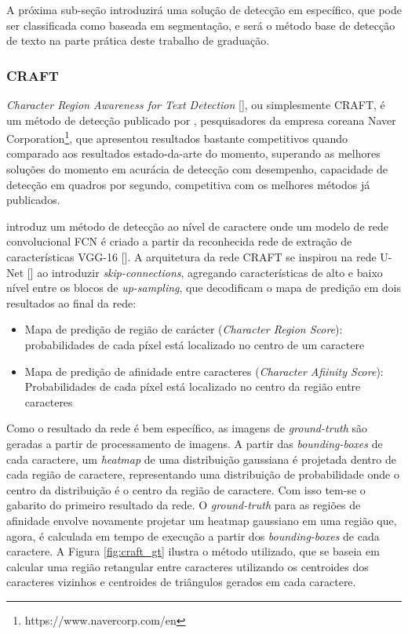 A próxima sub-seção introduzirá uma solução de detecção em específico, que pode ser classificada como baseada em segmentação, e será o método base de detecção 
de texto na parte prática deste trabalho de graduação.


\subsubsection{CRAFT}\label{craft}
\textit{Character Region Awareness for Text Detection} [], ou simplesmente CRAFT, é um método de detecção publicado por \citeauthor{CRAFT}, 
pesquisadores da empresa coreana Naver Corporation\footnote{https://www.navercorp.com/en}, que apresentou resultados bastante competitivos quando comparado 
aos resultados estado-da-arte do momento, superando as melhores soluções do momento em acurácia de detecção com desempenho, capacidade de detecção em quadros 
por segundo, competitiva com os melhores métodos já publicados.
	
\citeauthor{CRAFT} introduz um método de detecção ao nível de caractere onde um modelo de rede convolucional FCN é criado a partir da reconhecida rede de 
extração de características VGG-16 []. A arquitetura da rede CRAFT se inspirou na rede U-Net [] ao introduzir 
\textit{skip-connections}, agregando características de alto e baixo nível entre os blocos de \textit{up-sampling}, que decodificam o mapa de predição em 
dois resultados ao final da rede:

\begin{itemize}
    \item {Mapa de predição de região de carácter (\textit{Character Region Score}): probabilidades de cada píxel está localizado no centro de um caractere}

    \item {Mapa de predição de afinidade entre caracteres (\textit{Character Afiinity Score}): Probabilidades de cada píxel está localizado no centro da região entre caracteres}
\end{itemize}

Como o resultado da rede é bem específico, as imagens de \textit{ground-truth} são geradas a partir de processamento de imagens. A partir das 
\textit{bounding-boxes} de cada caractere, um \textit{heatmap} de uma distribuição gaussiana é projetada dentro de cada região de caractere, representando 
uma distribuição de probabilidade onde o centro da distribuição é o centro da região de caractere. Com isso tem-se o gabarito do primeiro resultado da rede. 
O \textit{ground-truth} para as regiões de afinidade envolve novamente projetar um heatmap gaussiano em uma região que, agora, é calculada em tempo de 
execução a partir dos \textit{bounding-boxes} de cada caractere. A Figura \ref{fig:craft_gt}  ilustra o método utilizado, que se baseia em calcular uma 
região retangular entre caracteres utilizando os centroides dos caracteres vizinhos e centroides de triângulos gerados em cada caractere.


